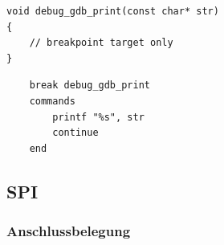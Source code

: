 \documentclass[11pt]{article}
\begin{document}
\begin{listing}[H]
    \begin{verbatim}
void debug_gdb_print(const char* str)
{
    // breakpoint target only
}
    \end{verbatim}
\caption{Auszug aus \texttt{test/sd\_test.cpp}}
\label{listing:gdbdebug3}
\end{listing}

\begin{listing}[H]
    \begin{verbatim}
    break debug_gdb_print
    commands
        printf "%s", str
        continue
    end
    \end{verbatim}
\caption{Auszug aus \texttt{test/spi\_test.gdb}}
\label{listing:gdbdebug2}
\end{listing}








\subsection{SPI}

\subsubsection{Anschlussbelegung}
\end{document}
